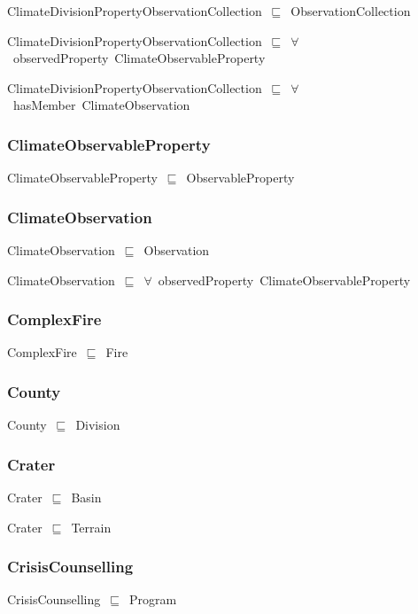 \documentclass{article}
\begin{document}
ClimateDivisionPropertyObservationCollection~\ensuremath{\sqsubseteq}~ObservationCollection~

ClimateDivisionPropertyObservationCollection~\ensuremath{\sqsubseteq}~\ensuremath{\forall}~observedProperty~ClimateObservableProperty~

ClimateDivisionPropertyObservationCollection~\ensuremath{\sqsubseteq}~\ensuremath{\forall}~hasMember~ClimateObservation~

\subsubsection*{ClimateObservableProperty}

ClimateObservableProperty~\ensuremath{\sqsubseteq}~ObservableProperty~

\subsubsection*{ClimateObservation}

ClimateObservation~\ensuremath{\sqsubseteq}~Observation~

ClimateObservation~\ensuremath{\sqsubseteq}~\ensuremath{\forall}~observedProperty~ClimateObservableProperty~

\subsubsection*{ComplexFire}

ComplexFire~\ensuremath{\sqsubseteq}~Fire~

\subsubsection*{County}

County~\ensuremath{\sqsubseteq}~Division~

\subsubsection*{Crater}

Crater~\ensuremath{\sqsubseteq}~Basin~

Crater~\ensuremath{\sqsubseteq}~Terrain~

\subsubsection*{CrisisCounselling}

CrisisCounselling~\ensuremath{\sqsubseteq}~Program~
\end{document}
